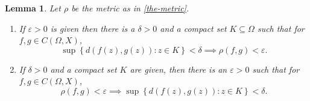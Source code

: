 \documentclass[11pt]{article}
\theoremstyle{thmstyle}
\newtheorem{lemma}[theorem]{Lemma}
\theoremstyle{defstyle}
\begin{document}
\begin{lemma}
    Let $\rho$ be the metric as in \eqref{the-metric}. 
    \begin{enumerate}[label=(\arabic*)]
        \item If $\varepsilon > 0$ is given then there is a $\delta > 0$ and a compact set $K\subseteq\Omega$ such that for $f,g\in C(\Omega, X)$, 
        \begin{equation*}
            \sup\left\{d(f(z), g(z))\colon z\in K\right\} < \delta \implies \rho(f, g) < \varepsilon.
        \end{equation*}
        \item If $\delta > 0$ and a compact set $K$ are given, then there is an $\varepsilon > 0$ such that for $f, g\in C(\Omega, X)$, 
        \begin{equation*}
            \rho(f, g) < \varepsilon\implies\sup\left\{d(f(z), g(z))\colon z\in K\right\} < \delta.
        \end{equation*}
    \end{enumerate}
\end{lemma}
\end{document}
